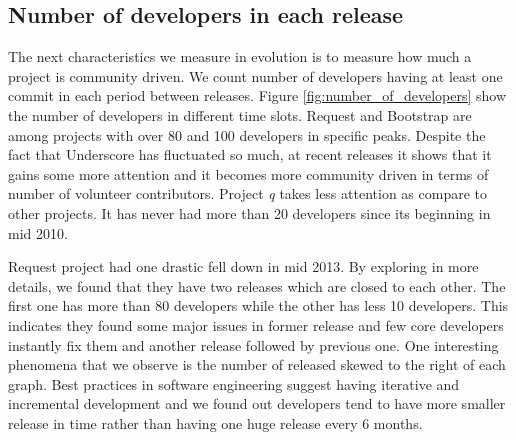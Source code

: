 \subsection{Number of developers in each release}
The next characteristics we measure in evolution is to measure how much a project is community driven. We count number of developers having at least one commit in each period between releases. Figure \ref{fig:number_of_developers} show the number of developers in different time slots. Request and Bootstrap are among projects with over 80 and 100 developers in specific peaks. Despite the fact that Underscore has fluctuated so much, at recent releases it shows that it gains some more attention and it becomes more community driven in terms of number of volunteer contributors. Project \textit{q} takes less attention as compare to other projects. It has never had more than 20 developers since its beginning in mid 2010.
\par
Request project had one drastic fell down in mid 2013. By exploring in more details, we found that they have two releases which are closed to each other. The first one has more than 80 developers while the other has less 10 developers. This indicates they found some major issues in former release and few core developers instantly fix them and another release followed by previous one. One interesting phenomena that we observe is the number of released skewed to the right of each graph. Best practices in software engineering suggest having iterative and incremental development and we found out developers tend to have more smaller release in time rather than having one huge release every 6 months.  
